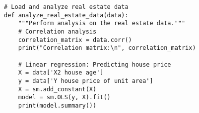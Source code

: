\begin{lstlisting}[caption=Real Estate Data Analysis Code]
# Load and analyze real estate data
def analyze_real_estate_data(data):
    """Perform analysis on the real estate data."""
    # Correlation analysis
    correlation_matrix = data.corr()
    print("Correlation matrix:\n", correlation_matrix)

    # Linear regression: Predicting house price
    X = data['X2 house age']
    y = data['Y house price of unit area']
    X = sm.add_constant(X)
    model = sm.OLS(y, X).fit()
    print(model.summary())
\end{lstlisting} 